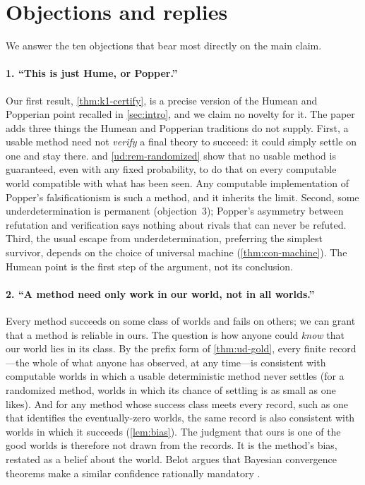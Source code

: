 \section{Objections and replies}\label{sec:objections}

We answer the ten objections that bear most directly on the main claim.

\paragraph{1. ``This is just Hume, or Popper.''}
Our first result,
\cref{thm:k1-certify}, is a precise version of the Humean and Popperian point recalled
in \cref{sec:intro}, and we claim no novelty
for it. The paper adds three things the Humean and Popperian traditions do not
supply. First, a usable method need not \emph{verify} a final theory to succeed: it
could simply settle on one and stay there.  and
\cref{ud:rem-randomized} show that no usable method is guaranteed, even with any fixed
probability, to do that on every computable world compatible with what has been seen.
Any computable implementation of Popper's falsificationism is such a method, and it
inherits the limit. Second, some underdetermination is permanent (objection~3); Popper's
asymmetry between refutation and verification says nothing about rivals that can
never be refuted. Third, the usual escape from underdetermination, preferring the
simplest survivor, depends on the choice of universal machine
(\cref{thm:con-machine}). The Humean point is the first step of the argument, not
its conclusion.

\paragraph{2. ``A method need only work in our world, not in all worlds.''}
Every method
succeeds on some class of worlds and fails on others; we can grant that a method is
reliable in ours. The question is how anyone could \emph{know} that our world lies
in its class. By the prefix form of \cref{thm:ud-gold}, every finite record---the
whole of what anyone has observed, at any time---is consistent with computable worlds
in which a usable deterministic method never settles (for a randomized method, worlds
in which its chance of settling is as small as one likes). And for any method whose
success class meets every record, such as one that identifies the eventually-zero
worlds, the same record is also consistent with worlds in which it succeeds
(\cref{lem:bias}).
The judgment that ours is one of the good worlds is therefore not drawn from the
records. It is the method's bias, restated as a belief about the world. Belot argues that Bayesian
convergence theorems make a similar confidence rationally mandatory \citep{belot2013}.

